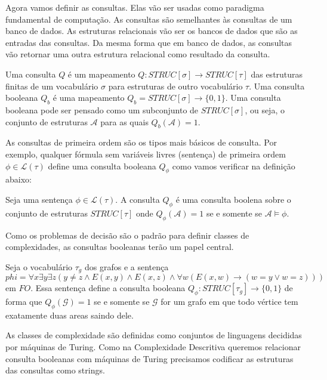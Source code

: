 Agora vamos definir as consultas. Elas vão ser usadas como paradigma fundamental de computação. As consultas são semelhantes às consultas de um banco de dados. As estruturas relacionais vão ser os bancos de dados que são as entradas das consultas. Da mesma forma que em banco de dados, as consultas vão retornar uma outra estrutura relacional como resultado da consulta.
\begin{defi}
Uma consulta $Q$ é um mapeamento $Q : STRUC[\sigma] \to STRUC[\tau]$ das estruturas finitas de um vocabulário $\sigma$ para estruturas de outro vocabulário $\tau$. Uma consulta booleana $Q_b$ é uma mapeamento $Q_b = STRUC[\sigma] \to \{0, 1\}$. Uma consulta booleana pode ser pensado como um subconjunto de $STRUC[\sigma]$, ou seja, o conjunto de estruturas $\mathcal{A}$ para as quais $Q_b(\mathcal{A}) = 1$.
\end{defi}

As consultas de primeira ordem são os tipos mais básicos de consulta. Por exemplo, qualquer fórmula sem variáveis livres (sentença) de primeira ordem $\phi \in \mathcal{L}(\tau)$ define uma consulta booleana $Q_{\phi}$ como vamos verificar na definição abaixo: 

\begin{defi}
Seja uma sentença $\phi \in \mathcal{L}(\tau)$. A consulta $Q_{\phi}$ é uma consulta boolena 
sobre o conjunto de estruturas $STRUC[\tau]$ onde $Q_{\phi}(\mathcal{A}) = 1$ se e somente se $\mathcal{A} \models \phi$.
\end{defi}

Como os problemas de decisão são o padrão para definir classes de complexidades, as consultas booleanas terão um papel central.

\begin{exem}
Seja o vocabulário $\tau_g$ dos grafos e a sentença $phi = \forall x \exists y \exists z (y \ne z \wedge E(x, y) \wedge E(x, z) \wedge \forall w (E(x, w) \to (w = y \vee w = z)))$ em $FO$. Essa sentença define a consulta booleana $Q_\phi : STRUC[\tau_g] \to \{0, 1\}$ de forma que $Q_\phi(\mathcal{G}) = 1$ se e somente se $\mathcal{G}$ for um grafo em que todo vértice tem exatamente duas areas saindo dele.
\end{exem}

As classes de complexidade são definidas como conjuntos de linguagens decididas por máquinas de Turing. Como na Complexidade Descritiva queremos relacionar consulta booleanas com máquinas de Turing precisamos codificar as estruturas das consultas como strings.

